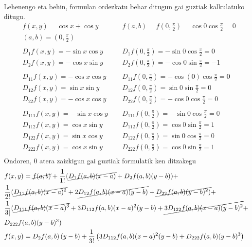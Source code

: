 Lehenengo eta behin, formulan ordezkatu behar ditugun gai guztiak kalkulatuko ditugu.
\begin{equation*}
    \begin{array}{lll}
    & f(x,y)=\cos{x}+\cos{y}\qquad &f(a,b)=f(0,\frac{\pi}{2})=\cos{0}\cos{\frac{\pi}{2}}=0\\
    &(a,b)=(0,\frac{\pi}{2})&\\
    \\
    & D_1f(x,y)=-\sin{x}\cos{y}\qquad & D_1f(0,\frac{\pi}{2})=-\sin{0}\cos{\frac{\pi}{2}}=0 \\
    & D_2f(x,y)=-\cos{x}\sin{y}& D_2f(0,\frac{\pi}{2})=-\cos{0}\sin{\frac{\pi}{2}=-1}\\
    \\
    & D_{11}f(x,y)=-\cos{x}\cos{y}& D_{11}f(0,\frac{\pi}{2})=-\cos(0)\cos{\frac{\pi}{2}}=0\\
    
    & D_{12}f(x,y)=\sin{x}\sin{y} &D_{12}f(0,\frac{\pi}{2})=\sin{0}\sin{\frac{\pi}{2}}=0\\
    
    &D_{22}f(x,y)=-\cos{x}\cos{y}&D_{22}f(0,\frac{\pi}{2})=-\cos{0}\cos{\frac{\pi}{2}}=0\\
    \\
    &D_{111}f(x,y)=-\sin{x}\cos{y}&D_{111}f(0,\frac{\pi}{2})=-\sin{0}\cos{\frac{\pi}{2}}=0\\
    
    &D_{112}f(x,y)=\cos{x}\sin{y}&D_{112}f(0,\frac{\pi}{2})=\cos{0}\sin{\frac{\pi}{2}}=1\\
    
    &D_{122}f(x,y)=\sin{x}\cos{y}&D_{122}f(0,\frac{\pi}{2})=\sin{0}\cos{\frac{\pi}{2}}=0\\
    
    &D_{222}f(x,y)=\cos{x}\sin{y}&D_{222}f(0,\frac{\pi}{2})=\cos{0}\sin{\frac{\pi}{2}}=1\\
    \end{array}
\end{equation*}
Ondoren, 0 atera zaizkigun gai guztiak formulatik ken ditzakegu
\begin{equation*}
\begin{split}
    &f(x,y)=\cancel{f(a,b)}+\frac{1}{1!}(\cancel{D_1f(a,b)(x-a)}+D_2f(a,b)(y-b))+\\
    &\frac{1}{2!}(\cancel{D_{11}f(a,b)(x-a)^2} +2 \cancel{D_{12}f(a,b)(x-a)(y-b)}+\cancel{D_{22}f(a,b)(y-b)^2)}+\\
    &\frac{1}{3|}(\cancel{D_{111}f(a,b)(x-a)^3}+3D_{112}f(a,b)(x-a)^2(y-b)+\cancel{3D_{122}f(a,b)(x-a)(y-b)^2}+\\
    &D_{222}f(a,b)(y-b)^3)\\
    &f(x,y)=D_2f(a,b)\left(y-b\right)+\frac{1}{3!}\left(3D_{112}f(a,b)(x-a)^2(y-b)+ D_{222}f(a,b)(y-b)^3 \right)\\
    &\\
\end{split}
\end{equation*}
